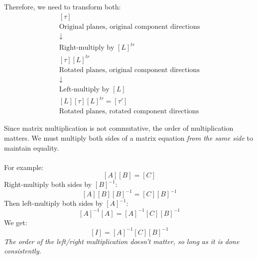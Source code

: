 ﻿\documentclass[12pt]{article}
\begin{document}
Therefore, we need to transform both:
\[
\begin{gathered}
[\tau]\\
\text{Original planes, original component directions}\\[4pt]
\downarrow\\[4pt]
\text{Right-multiply by } [L]^{tr}\\
[\tau][L]^{tr}\\
\text{Rotated planes, original component directions}\\[4pt]
\downarrow\\[4pt]
\text{Left-multiply by } [L]\\
[L][\tau][L]^{tr}=[\tau']\\
\text{Rotated planes, rotated component directions}
\end{gathered}
\]
\begin{notebox}[]
    Since matrix multiplication is not commutative, the order of multiplication matters. We must multiply both sides of a matrix equation \textit{from the same side} to maintain equality.\\\\
    For example:
    \[
[A][B]=[C]
\]
Right-multiply both sides by $[B]^{-1}$:
\[
[A][B][B]^{-1}
=[C][B]^{-1}
\]
Then left-multiply both sides by $[A]^{-1}$:
\[[A]^{-1}[A]
=[A]^{-1}[C][B]^{-1}
\]
We get:
\[
[I]=[A]^{-1}[C][B]^{-1}
\]
\textit{The order of the left/right multiplication doesn't matter, so long as it is done consistently.}
\end{notebox}
\end{document}
